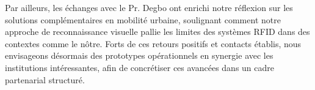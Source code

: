 \documentclass[12pt, a4paper]{article}
\begin{document}
Par ailleurs, les échanges avec le Pr. Degbo ont enrichi notre réflexion sur les solutions complémentaires en mobilité urbaine, soulignant comment notre approche de reconnaissance visuelle pallie les limites des systèmes RFID dans des contextes comme le nôtre. Forts de ces retours positifs et contacts établis, nous envisageons désormais des prototypes opérationnels en synergie avec les institutions intéressantes, afin de concrétiser ces avancées dans un cadre partenarial structuré.


\end{document}

